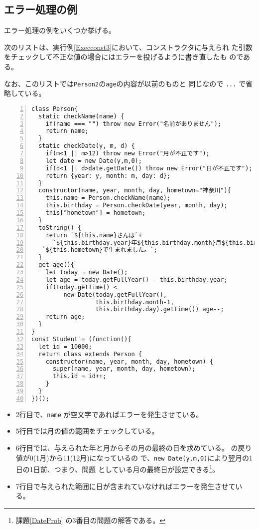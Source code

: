 \subsection{エラー処理の例}
エラー処理の例をいくつか挙げる。
 \begin{Exec}\upshape\label{throwError}
	次のリストは、実行例\ref{Execconst3}において、コンストラクタに与えられ
	た引数をチェックして不正な値の場合にはエラーを投げるように書き直したも
	のである。

	なお、このリストでは\texttt{Person2}の\texttt{age}の内容が以前のものと
	同じなので \texttt{...} で省略している。
 \end{Exec}
\begin{Verbatim}[numbers=left]
class Person{
  static checkName(name) {
    if(name === "") throw new Error("名前がありません");
    return name;
  }
  static checkDate(y, m, d) {
    if(m<1 || m>12) throw new Error("月が不正です");
    let date = new Date(y,m,0);
    if(d<1 || d>date.getDate()) throw new Error("日が不正です");
    return {year: y, month: m, day: d};
  }
  constructor(name, year, month, day, hometown="神奈川"){
    this.name = Person.checkName(name);
    this.birthday = Person.checkDate(year, month, day);
    this["hometown"] = hometown;
  }
  toString() {
    return `${this.name}さんは`+
      `${this.birthday.year}年${this.birthday.month}月${this.birthday.day}日に}` +
   `${this.hometown}で生まれました。`;
  }
  get age(){
    let today = new Date();
    let age = today.getFullYear() - this.birthday.year;
    if(today.getTime() <
         new Date(today.getFullYear(),
                  this.birthday.month-1,
                  this.birthday.day).getTime()) age--;
    return age;
  }
}
const Student = (function(){
  let id = 10000;
  return class extends Person {
    constructor(name, year, month, day, hometown) {
      super(name, year, month, day, hometown);
      this.id = id++;
    }
  }
})();
\end{Verbatim}
\begin{itemize}
 \item 2行目で、\texttt{name} が空文字であればエラーを発生させている。
 \item 5行目では月の値の範囲をチェックしている。
 \item 6行目では、与えられた年と月からその月の最終の日を求めている。
			 の戻り値が0(1月)から11(12月)になっているの
			 で、\texttt{new Date(y,m,0)}により翌月の1日の1日前、つまり、問題
			 としている月の最終日が設定できる\footnote{課題\ref{DateProb}
			 の3番目の問題の解答である。}。
 \item 7行目で与えられた範囲に日が含まれていなければエラーを発生させてい
			 る。
\end{itemize}
